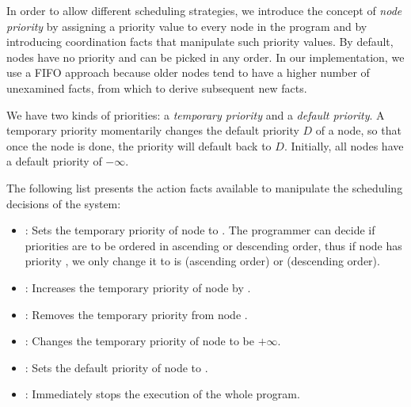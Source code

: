 
In order to allow different scheduling strategies, we introduce the concept of
\emph{node priority} by assigning a priority value to every node in the program
and by introducing coordination facts that manipulate such priority values.  By
default, nodes have no priority and can be picked in any order. In our
implementation, we use a FIFO approach because older nodes tend to have a higher
number of unexamined facts, from which to derive subsequent new facts.

We have two kinds of priorities: a \emph{temporary priority} and a \emph{default
   priority}. A temporary priority momentarily changes the default priority $D$
of a node, so that once the node is done, the priority will default back to $D$.
Initially, all nodes have a default priority of $-\infty$.

The following list presents the action facts available to manipulate the
scheduling decisions of the system:

\begin{itemize}

   \item {}: Sets the temporary priority of
      node  to .  The programmer can decide if priorities
      are to be ordered in ascending or descending order, thus if node 
      has priority , we only change it to  is 
      (ascending order) or  (descending order).

   \item {}: Increases the temporary priority
      of node  by .

   \item {}: Removes the temporary priority from node
   .

   \item {}: Changes the temporary priority of node
    to be $+\infty$.

   \item {}: Sets the default
      priority of node  to .

   \item {}: Immediately stops the execution of the whole program.

\end{itemize}

